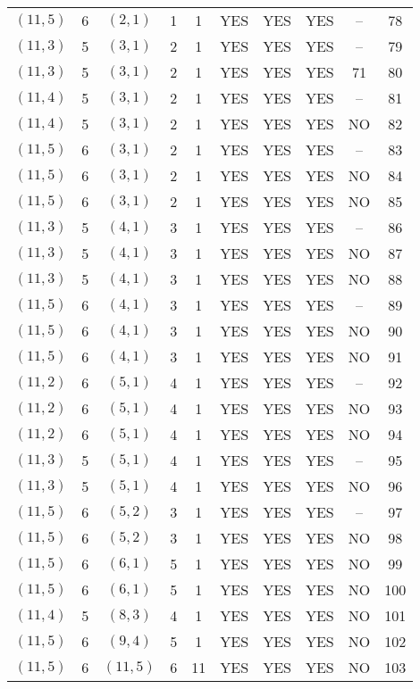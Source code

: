 \begin{longtable}{|c|c|c|c|c|c|c|c|c|c|}
$(11, 5)$ & 6 & $(2, 1)$ & 1 & 1 & YES & YES & YES & -- & 78\\
$(11, 3)$ & 5 & $(3, 1)$ & 2 & 1 & YES & YES & YES & -- & 79\\
$(11, 3)$ & 5 & $(3, 1)$ & 2 & 1 & YES & YES & YES & 71 & 80\\
$(11, 4)$ & 5 & $(3, 1)$ & 2 & 1 & YES & YES & YES & -- & 81\\
$(11, 4)$ & 5 & $(3, 1)$ & 2 & 1 & YES & YES & YES & NO & 82\\
$(11, 5)$ & 6 & $(3, 1)$ & 2 & 1 & YES & YES & YES & -- & 83\\
$(11, 5)$ & 6 & $(3, 1)$ & 2 & 1 & YES & YES & YES & NO & 84\\
$(11, 5)$ & 6 & $(3, 1)$ & 2 & 1 & YES & YES & YES & NO & 85\\
$(11, 3)$ & 5 & $(4, 1)$ & 3 & 1 & YES & YES & YES & -- & 86\\
$(11, 3)$ & 5 & $(4, 1)$ & 3 & 1 & YES & YES & YES & NO & 87\\
$(11, 3)$ & 5 & $(4, 1)$ & 3 & 1 & YES & YES & YES & NO & 88\\
$(11, 5)$ & 6 & $(4, 1)$ & 3 & 1 & YES & YES & YES & -- & 89\\
$(11, 5)$ & 6 & $(4, 1)$ & 3 & 1 & YES & YES & YES & NO & 90\\
$(11, 5)$ & 6 & $(4, 1)$ & 3 & 1 & YES & YES & YES & NO & 91\\
$(11, 2)$ & 6 & $(5, 1)$ & 4 & 1 & YES & YES & YES & -- & 92\\
$(11, 2)$ & 6 & $(5, 1)$ & 4 & 1 & YES & YES & YES & NO & 93\\
$(11, 2)$ & 6 & $(5, 1)$ & 4 & 1 & YES & YES & YES & NO & 94\\
$(11, 3)$ & 5 & $(5, 1)$ & 4 & 1 & YES & YES & YES & -- & 95\\
$(11, 3)$ & 5 & $(5, 1)$ & 4 & 1 & YES & YES & YES & NO & 96\\
$(11, 5)$ & 6 & $(5, 2)$ & 3 & 1 & YES & YES & YES & -- & 97\\
$(11, 5)$ & 6 & $(5, 2)$ & 3 & 1 & YES & YES & YES & NO & 98\\
$(11, 5)$ & 6 & $(6, 1)$ & 5 & 1 & YES & YES & YES & NO & 99\\
$(11, 5)$ & 6 & $(6, 1)$ & 5 & 1 & YES & YES & YES & NO & 100\\
$(11, 4)$ & 5 & $(8, 3)$ & 4 & 1 & YES & YES & YES & NO & 101\\
$(11, 5)$ & 6 & $(9, 4)$ & 5 & 1 & YES & YES & YES & NO & 102\\
$(11, 5)$ & 6 & $(11, 5)$ & 6 & 11 & YES & YES & YES & NO & 103\\

\end{longtable}
